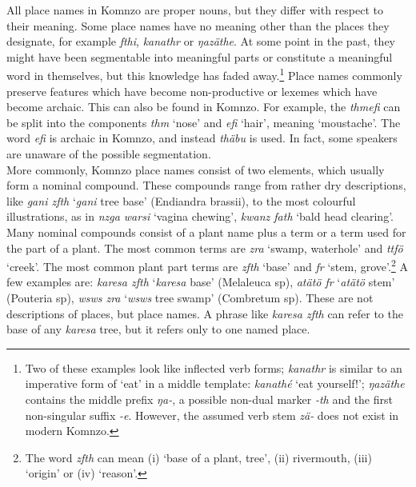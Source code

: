 All place names in Komnzo are proper nouns, but they differ with respect to their meaning. Some place names have no meaning other than the places they designate, for example \emph{fthi}, \emph{kanathr} or \emph{ŋazäthe}. At some point in the past, they might have been segmentable into meaningful parts or constitute a meaningful word in themselves, but this knowledge has faded away.\footnote{Two of these examples look like inflected verb forms; \emph{kanathr} is similar to an imperative form of `eat' in a middle template: \emph{kanathé} `eat yourself!'; \emph{ŋazäthe} contains the middle prefix \emph{ŋa-}, a possible non-dual marker \emph{-th} and the first non-singular suffix \emph{-e}. However, the assumed verb stem \emph{zä-} does not exist in modern Komnzo.} Place names commonly preserve features which have become non-productive or lexemes which have become archaic. This can also be found in Komnzo. For example, the  \emph{thmefi} can be split into the components \emph{thm} `nose' and \emph{efi} `hair', meaning `moustache'.  The word \emph{efi} is archaic in Komnzo, and instead \emph{thäbu} is used. In fact, some speakers are unaware of the possible segmentation.\\

More commonly, Komnzo place names consist of two elements, which usually form a nominal compound. These compounds range from rather dry descriptions, like \emph{gani zfth} `\emph{gani} tree base' (Endiandra brassii), to the most colourful illustrations, as in \emph{nzga warsi} `vagina chewing', \emph{kwanz fath} `bald head clearing'. Many nominal compounds consist of a plant name plus a  term or a term used for the part of a plant. The most common  terms are \emph{zra} `swamp, waterhole' and \emph{ttfö} `creek'. The most common plant part terms are \emph{zfth} `base' and \emph{fr} `stem, grove'.\footnote{The word \emph{zfth} can mean (i) `base of a plant, tree', (ii) rivermouth, (iii) `origin' or (iv) `reason'.} A few examples are: \emph{karesa zfth} `\emph{karesa} base' (Melaleuca sp), \emph{atätö fr} `\emph{atätö} stem' (Pouteria sp), \emph{wsws zra} `\emph{wsws} tree swamp' (Combretum sp). These are not descriptions of places, but place names. A phrase like \emph{karesa zfth} can refer to the base of any \emph{karesa} tree, but it refers only to one named place.\\

